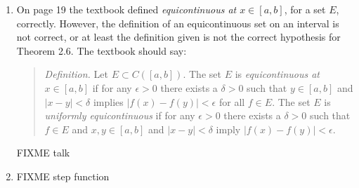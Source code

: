 \documentclass[12pt]{amsart}
\newcommand{\eps}{\epsilon}
\begin{document}
\begin{enumerate}
\item On page 19 the textbook defined \emph{equicontinuous at $x \in [a,b]$}, for a set $E$, correctly.  However, the definition of an equicontinuous set on an interval is not correct, or at least the definition given is not the correct hypothesis for Theorem 2.6.  The textbook should say:

\medskip
\begin{quote}
\emph{Definition.}  Let $E\subset C([a,b])$.  The set $E$ is \emph{equicontinuous at} $x\in[a,b]$ if for any $\eps>0$ there exists a $\delta>0$ such that $y\in[a,b]$ and $|x-y|<\delta$ implies $|f(x)-f(y)|<\eps$ for all $f\in E$.  The set $E$ is \emph{uniformly equicontinuous} if for any $\eps>0$ there exists a $\delta > 0$ such that $f\in E$ and $x,y\in[a,b]$ and $|x-y|<\delta$ imply $|f(x)-f(y)|<\eps$.
\end{quote}

FIXME talk

\item FIXME step function
\end{enumerate}
\end{document}
